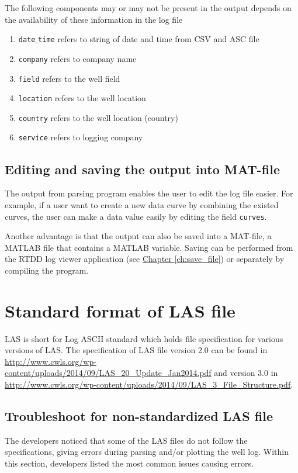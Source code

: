 \documentclass[12pt,a4paper,oneside]{report}
\begin{document}
\begin{appendices}
The following components may or may not be present in the output depends on the availability of these information in the log file
\begin{enumerate}
\setlength\itemsep{0.08em}
\item \texttt{date$\_$time} refers to string of date and time from CSV and ASC file
\item \texttt{company} refers to company name
\item \texttt{field} refers to the well field
\item \texttt{location} refers to the well location
\item \texttt{country} refers to the well location (country)
\item \texttt{service} refers to logging company
\end{enumerate}

\section{Editing and saving the output into MAT-file}
The output from parsing program enables the user to edit the log file easier. For example, if a user want to create a new data curve by combining the existed curves, the user can make a data value easily by editing the field \texttt{curves}.

Another advantage is that the output can also be saved into a MAT-file, a MATLAB file that contains a MATLAB variable. Saving can be performed from the RTDD log viewer application (see \hyperref[ch:save_file]{Chapter \ref{ch:save_file}}) or separately by compiling the program.

\chapter{Standard format of LAS file}
\label{ch:las_std}
LAS is short for Log ASCII standard which holds file specification for various versions of LAS. The specification of LAS file version 2.0 can be found in \url{http://www.cwls.org/wp-content/uploads/2014/09/LAS_20_Update_Jan2014.pdf} and version 3.0 in \url{http://www.cwls.org/wp-content/uploads/2014/09/LAS_3_File_Structure.pdf}.

\section{Troubleshoot for non-standardized LAS file}
The developers noticed that some of the LAS files do not follow the specifications, giving errors during parsing and/or plotting the well log. Within this section, developers listed the most common issues causing errors.


\end{appendices}
\end{document}
